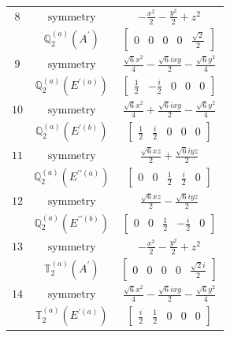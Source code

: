 \documentclass[fleqn,8pt,landscape]{jsarticle}
\begin{document}
\begin{longtable}{ccc}
$ 8 $ & $ \text{symmetry} $ & $ - \frac{x^{2}}{2} - \frac{y^{2}}{2} + z^{2} $ \\
$  $ & $ \mathbb{Q}_{2}^{(a)}(A^{\prime}) $ & $ \begin{bmatrix} 0 & 0 & 0 & 0 & \frac{\sqrt{2}}{2} \end{bmatrix} $ \\ \hline
$ 9 $ & $ \text{symmetry} $ & $ \frac{\sqrt{6} x^{2}}{4} - \frac{\sqrt{6} i x y}{2} - \frac{\sqrt{6} y^{2}}{4} $ \\
$  $ & $ \mathbb{Q}_{2}^{(a)}(E^{\prime(a)}) $ & $ \begin{bmatrix} \frac{1}{2} & - \frac{i}{2} & 0 & 0 & 0 \end{bmatrix} $ \\ \hline
$ 10 $ & $ \text{symmetry} $ & $ \frac{\sqrt{6} x^{2}}{4} + \frac{\sqrt{6} i x y}{2} - \frac{\sqrt{6} y^{2}}{4} $ \\
$  $ & $ \mathbb{Q}_{2}^{(a)}(E^{\prime(b)}) $ & $ \begin{bmatrix} \frac{1}{2} & \frac{i}{2} & 0 & 0 & 0 \end{bmatrix} $ \\ \hline
$ 11 $ & $ \text{symmetry} $ & $ \frac{\sqrt{6} x z}{2} + \frac{\sqrt{6} i y z}{2} $ \\
$  $ & $ \mathbb{Q}_{2}^{(a)}(E^{\prime\prime(a)}) $ & $ \begin{bmatrix} 0 & 0 & \frac{1}{2} & \frac{i}{2} & 0 \end{bmatrix} $ \\ \hline
$ 12 $ & $ \text{symmetry} $ & $ \frac{\sqrt{6} x z}{2} - \frac{\sqrt{6} i y z}{2} $ \\
$  $ & $ \mathbb{Q}_{2}^{(a)}(E^{\prime\prime(b)}) $ & $ \begin{bmatrix} 0 & 0 & \frac{1}{2} & - \frac{i}{2} & 0 \end{bmatrix} $ \\ \hline
$ 13 $ & $ \text{symmetry} $ & $ - \frac{x^{2}}{2} - \frac{y^{2}}{2} + z^{2} $ \\
$  $ & $ \mathbb{T}_{2}^{(a)}(A^{\prime}) $ & $ \begin{bmatrix} 0 & 0 & 0 & 0 & \frac{\sqrt{2} i}{2} \end{bmatrix} $ \\ \hline
$ 14 $ & $ \text{symmetry} $ & $ \frac{\sqrt{6} x^{2}}{4} - \frac{\sqrt{6} i x y}{2} - \frac{\sqrt{6} y^{2}}{4} $ \\
$  $ & $ \mathbb{T}_{2}^{(a)}(E^{\prime(a)}) $ & $ \begin{bmatrix} \frac{i}{2} & \frac{1}{2} & 0 & 0 & 0 \end{bmatrix} $ \\ \hline

\end{longtable}
\end{document}
